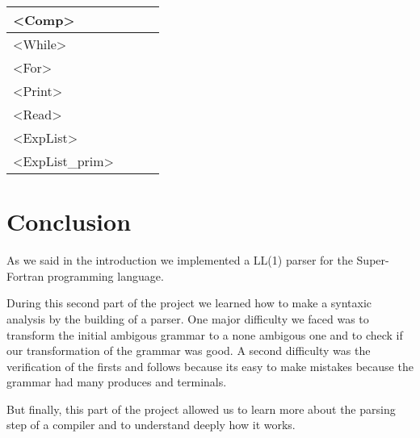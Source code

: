 \documentclass[12pt]{article}
\begin{document}
\begin{table}[H]
\begin{tabular}{|l|l|l|l|}
		\textless{}Comp\textgreater{}            &           &           &         \\ \hline
		\textless{}While\textgreater{}           &           &           &         \\ \hline
		\textless{}For\textgreater{}             &           &           &         \\ \hline
		\textless{}Print\textgreater{}           &           &           &         \\ \hline
		\textless{}Read\textgreater{}            &           &           &         \\ \hline
		\textless{}ExpList\textgreater{}         &           &           &         \\ \hline
		\textless{}ExpList\_prim\textgreater{}   &           &           &         \\ \hline
	\end{tabular}
\end{table}


\section{Conclusion}

As we said in the introduction we implemented a LL(1) parser for the Super-Fortran programming language.

During this second part of the project we learned how to make a syntaxic analysis by
the building of a parser.
One major difficulty we faced was to transform the initial ambigous grammar to a none ambigous one
and to check if our transformation of the grammar was good.
A second difficulty was the verification of the firsts and follows because its easy to make mistakes
because the grammar had many produces and terminals.

But finally, this part of the project allowed us to learn more about the parsing step of a compiler
and to understand deeply how it works.
\end{document}
